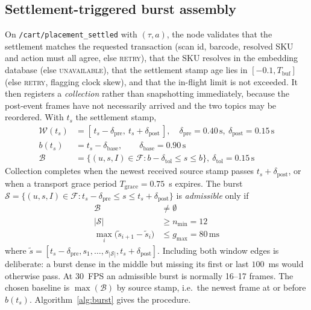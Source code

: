 \documentclass[conference]{IEEEtran}
\begin{document}
\subsection{Settlement-triggered burst assembly}
\label{sec:burst}
On \texttt{/cart/placement\_settled} with $(\tau,a)$, the node validates that the settlement matches
the requested transaction (scan id, barcode, resolved SKU and action must all agree, else
\textsc{retry}), that the SKU resolves in the embedding database (else \textsc{unavailable}), that the
settlement stamp age lies in $[-0.1,T_{\mathrm{buf}}]$ (else \textsc{retry}, flagging clock skew), and
that the in-flight limit is not exceeded. It then registers a \emph{collection} rather than
snapshotting immediately, because the post-event frames have not necessarily arrived and the two
topics may be reordered. With $t_s$ the settlement stamp,
\begin{align}
\mathcal{W}(t_s) &= [\,t_s-\delta_{\mathrm{pre}},\ t_s+\delta_{\mathrm{post}}\,],\quad
  \delta_{\mathrm{pre}}{=}0.40\,\mathrm{s},\ \delta_{\mathrm{post}}{=}0.15\,\mathrm{s}\\
b(t_s) &= t_s - \delta_{\mathrm{base}},\qquad \delta_{\mathrm{base}} = 0.90\,\mathrm{s}\\
\mathcal{B} &= \{(u,s,I)\in\mathcal{F} : b-\delta_{\mathrm{tol}} \le s \le b\},\
  \delta_{\mathrm{tol}}{=}0.15\,\mathrm{s}
\end{align}
Collection completes when the newest received source stamp passes $t_s+\delta_{\mathrm{post}}$, or
when a transport grace period $T_{\mathrm{grace}}=0.75$~s expires. The burst
$\mathcal{S}=\{(u,s,I)\in\mathcal{F} : t_s-\delta_{\mathrm{pre}} \le s \le t_s+\delta_{\mathrm{post}}\}$
is \emph{admissible} only if
\begin{align}
\mathcal{B} &\neq \emptyset\\
|\mathcal{S}| &\ge n_{\min} = 12\\
\max_i\big(\tilde{s}_{i+1}-\tilde{s}_i\big) &\le g_{\max} = 80\,\mathrm{ms}
\end{align}
where $\tilde{s}=[t_s-\delta_{\mathrm{pre}},s_1,\dots,s_{|\mathcal{S}|},t_s+\delta_{\mathrm{post}}]$.
Including both window edges is deliberate: a burst dense in the middle but missing its first or last
$100$~ms would otherwise pass. At 30~FPS an admissible burst is normally 16--17 frames. The chosen
baseline is $\max(\mathcal{B})$ by source stamp, i.e.\ the newest frame at or before $b(t_s)$.
Algorithm~\ref{alg:burst} gives the procedure.
\end{document}
